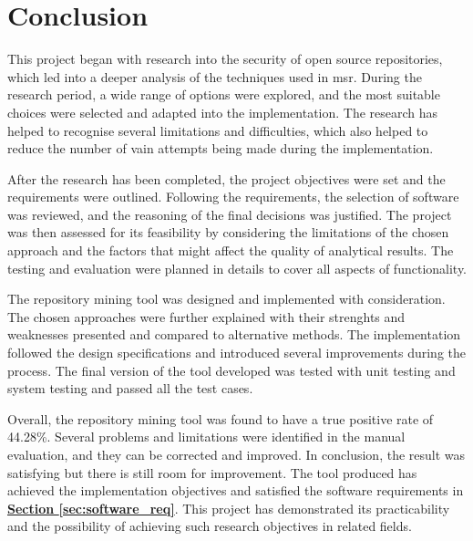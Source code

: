 \documentclass[12pt, a4paper]{report}
\begin{document}
\chapter{Conclusion}
This project began with research into the security of open source repositories, which led into a
deeper analysis of the techniques used in \acrfull{msr}. During the research period, a wide range of
options were explored, and the most suitable choices were selected and adapted into the
implementation. The research has helped to recognise several limitations and difficulties, which
also helped to reduce the number of vain attempts being made during the implementation.

After the research has been completed, the project objectives were set and the requirements were
outlined. Following the requirements, the selection of software was reviewed, and the reasoning of
the final decisions was justified. The project was then assessed for its feasibility by considering
the limitations of the chosen approach and the factors that might affect the quality of analytical
results. The testing and evaluation were planned in details to cover all aspects of functionality.

The repository mining tool was designed and implemented with consideration. The chosen approaches
were further explained with their strenghts and weaknesses presented and compared to alternative
methods. The implementation followed the design specifications and introduced several improvements
during the process. The final version of the tool developed was tested with unit testing and system
testing and passed all the test cases.

Overall, the repository mining tool was found to have a true positive rate of 44.28\%. Several
problems and limitations were identified in the manual evaluation, and they can be corrected and
improved. In conclusion, the result was satisfying but there is still room for improvement. The tool
produced has achieved the implementation objectives and satisfied the software requirements in
\hyperref[sec:software_req]{\textbf{Section \ref*{sec:software_req}}}. This project has demonstrated
its practicability and the possibility of achieving such research objectives in related fields.

\printglossary[type=\acronymtype]
\printbibliography[heading=bibintoc]


\end{document}
